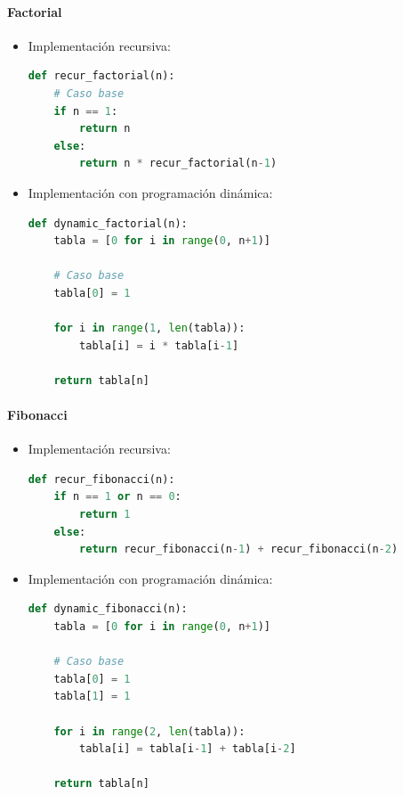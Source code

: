 \paragraph{Factorial}

\begin{itemize}
    \item Implementación recursiva:
    
    \begin{lstlisting}[language=Python]
def recur_factorial(n):
    # Caso base
    if n == 1:
        return n
    else:
        return n * recur_factorial(n-1)
    \end{lstlisting}
    
    \item Implementación con programación dinámica:
    
    \begin{lstlisting}[language=Python]
def dynamic_factorial(n):
    tabla = [0 for i in range(0, n+1)]
    
    # Caso base
    tabla[0] = 1
    
    for i in range(1, len(tabla)):
        tabla[i] = i * tabla[i-1]
    
    return tabla[n]
    \end{lstlisting}
\end{itemize}

\paragraph{Fibonacci}

\begin{itemize}
    \item Implementación recursiva:
    
    \begin{lstlisting}[language=Python]
def recur_fibonacci(n):
    if n == 1 or n == 0:
        return 1
    else:
        return recur_fibonacci(n-1) + recur_fibonacci(n-2)
    \end{lstlisting}
    
    \item Implementación con programación dinámica:
    
    \begin{lstlisting}[language=Python]
def dynamic_fibonacci(n):
    tabla = [0 for i in range(0, n+1)]
    
    # Caso base
    tabla[0] = 1
    tabla[1] = 1
    
    for i in range(2, len(tabla)):
        tabla[i] = tabla[i-1] + tabla[i-2]
    
    return tabla[n]
    \end{lstlisting}
\end{itemize}

